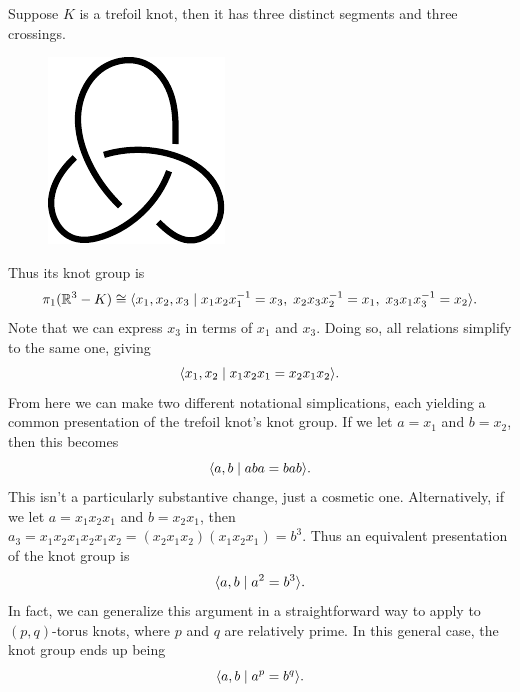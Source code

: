 \documentclass[twoside,10pt]{article}
\begin{document}
\begin{ex}
	Suppose $K$ is a trefoil knot, then it has three distinct segments and three crossings.
	\begin{figure}[H]
		\centering
		\includegraphics[scale=1]{fig/trefoil.pdf}
	\end{figure}
Thus its knot group is
\[
	\pi_1(\mathbb{R}^{3}-K) \cong \langle x_1,x_2,x_3 \;|\; x_1x_2x_1^{-1}=x_3, \; x_2x_3x_2^{-1}=x_1, \; x_3x_1x_3^{-1}=x_2 \rangle.
\]
Note that we can express $x_3$ in terms of $x_1$ and $x_3$. Doing so, all relations simplify to the same one, giving
\[
\langle x_1,x_2 \;|\; x_1x_2x_1 = x_2x_1x_2 \rangle.
\] 
From here we can make two different notational simplications, each yielding a common presentation of the trefoil knot's knot group. If we let $a=x_1$ and $b=x_2$, then this becomes
\[
\langle a,b \;|\; aba=bab \rangle.
\] This isn't a particularly substantive change, just a cosmetic one. Alternatively, if we let $a = x_1x_2x_1$ and $b=x_2x_1$, then $a_3 = x_1x_2x_1x_2x_1x_2 = (x_2x_1x_2)(x_1x_2x_1) = b^{3}$. Thus an equivalent presentation of the knot group is
\[
\langle a,b \;|\; a^{2}=b^{3} \rangle.
\] In fact, we can generalize this argument in a straightforward way to apply to $(p,q)$-torus knots, where $p$ and $q$ are relatively prime. In this general case, the knot group ends up being
\[
\langle a, b \;|\; a^{p}= b^{q} \rangle.
\] 
\end{ex}


\nocite{hatcher}
\nocite{linov}
\nocite{ncat}

\printbibliography
\end{document}
